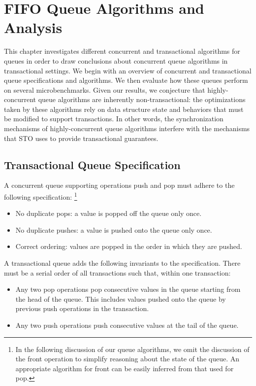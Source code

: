 \chapter{FIFO Queue Algorithms and Analysis}
\label{queue}

This chapter investigates different concurrent and transactional algorithms for queues in order to draw conclusions about concurrent queue algorithms in transactional settings. We begin with an overview of concurrent and transactional queue specifications and algorithms. We then evaluate how these queues perform on several microbenchmarks. Given our results, we conjecture that highly-concurrent queue algorithms are inherently non-transactional: the optimizations taken by these algorithms rely on data structure state and behaviors that must be modified to support transactions. In other words, the synchronization mechanisms of highly-concurrent queue algorithms interfere with the mechanisms that STO uses to provide transactional guarantees.

\section{Transactional Queue Specification}
\label{q_spec}
A concurrent queue supporting operations push and pop must adhere to the following specification:%
\footnote{In the following discussion of our queue algorithms, we omit the discussion of the front operation to simplify reasoning about the state of the queue. An appropriate algorithm for front can be easily inferred from that used for pop.}
\begin{itemize}
    \item No duplicate pops: a value is popped off the queue only once.
    \item No duplicate pushes: a value is pushed onto the queue only once.
    \item Correct ordering: values are popped in the order in which they are pushed.
\end{itemize}

\noindent
A transactional queue adds the following invariants to the specification. There must be a serial order of all transactions such that, within one transaction:
\begin{itemize}
    \item Any two pop operations pop consecutive values in the queue starting from the head of the queue. This includes values pushed onto the queue by previous push operations in the transaction.
    \item Any two push operations push consecutive values at the tail of the queue.
\end{itemize}

